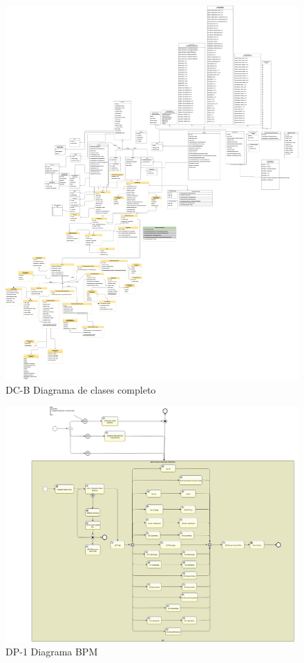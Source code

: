 		\begin{figure}[H]
		    \centering
			\includegraphics[width=18cm]{../imgs/disenio/DC.png}
			\caption{DC-B Diagrama de clases completo}
		\end{figure}
		\begin{figure}[H]
		    \centering
			\includegraphics[width=18cm]{../imgs/disenio/ProcesoAtencion.png}
			\caption{DP-1 Diagrama BPM}
		\end{figure}
	\newpage
